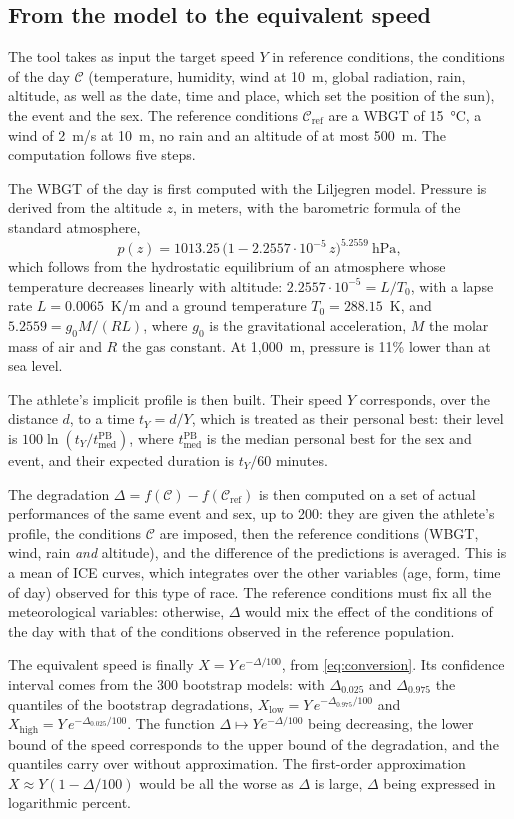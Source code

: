 \documentclass[11pt,a4paper]{article}
\newcommand{\PB}{\mathrm{PB}}
\begin{document}
\subsection{From the model to the equivalent speed}\label{sec:conversion_steps}

The tool takes as input the target speed $Y$ in reference conditions, the conditions of the day $\mathcal{C}$
(temperature, humidity, wind at 10~m, global radiation, rain, altitude, as well as the date, time and place, which set
the position of the sun), the event and the sex. The reference conditions $\mathcal{C}_{\text{ref}}$ are a WBGT of
15~°C, a wind of 2~m/s at 10~m, no rain and an altitude of at most 500~m. The computation follows five steps.

The WBGT of the day is first computed with the Liljegren model. Pressure is derived from the altitude $z$, in meters,
with the barometric formula of the standard atmosphere,
\[
p(z) = 1013.25\,\big(1 - 2.2557\cdot 10^{-5}\,z\big)^{5.2559}\ \text{hPa},
\]
which follows from the hydrostatic equilibrium of an atmosphere whose temperature decreases linearly with altitude:
$2.2557\cdot10^{-5} = L/T_0$, with a lapse rate $L = 0.0065$~K/m and a ground temperature $T_0 = 288.15$~K, and
$5.2559 = g_0 M/(R L)$, where $g_0$ is the gravitational acceleration, $M$ the molar mass of air and $R$ the gas
constant. At 1,000~m, pressure is 11\% lower than at sea level.

The athlete's implicit profile is then built. Their speed $Y$ corresponds, over the distance $d$, to a time
$t_Y = d/Y$, which is treated as their personal best: their level is $100\ln(t_Y/t^{\PB}_{\text{med}})$, where
$t^{\PB}_{\text{med}}$ is the median personal best for the sex and event, and their expected duration is $t_Y/60$
minutes.

The degradation $\Delta = f(\mathcal{C}) - f(\mathcal{C}_{\text{ref}})$ is then computed on a set of actual
performances of the same event and sex, up to 200: they are given the athlete's profile, the conditions $\mathcal{C}$
are imposed, then the reference conditions (WBGT, wind, rain \emph{and} altitude), and the difference of the
predictions is averaged. This is a mean of ICE curves, which integrates over the other variables (age, form, time of
day) observed for this type of race. The reference conditions must fix all the meteorological variables: otherwise,
$\Delta$ would mix the effect of the conditions of the day with that of the conditions observed in the reference
population.

The equivalent speed is finally $X = Y\,e^{-\Delta/100}$, from \eqref{eq:conversion}. Its confidence interval comes from
the 300 bootstrap models: with $\Delta_{0.025}$ and $\Delta_{0.975}$ the quantiles of the bootstrap degradations,
$X_{\text{low}} = Y\,e^{-\Delta_{0.975}/100}$ and $X_{\text{high}} = Y\,e^{-\Delta_{0.025}/100}$. The function
$\Delta \mapsto Y e^{-\Delta/100}$ being decreasing, the lower bound of the speed corresponds to the upper bound of the
degradation, and the quantiles carry over without approximation. The first-order approximation
$X \approx Y(1 - \Delta/100)$ would be all the worse as $\Delta$ is large, $\Delta$ being expressed in logarithmic
percent.
\end{document}
